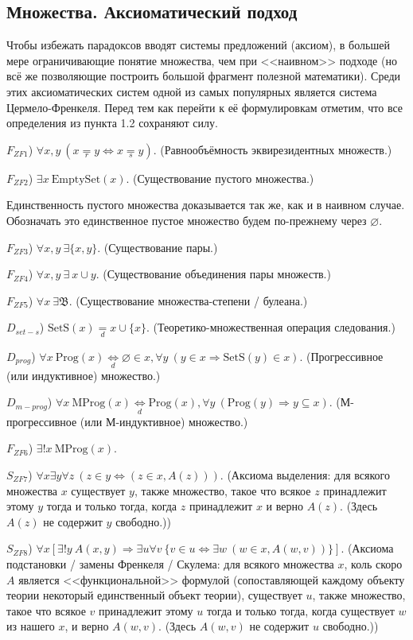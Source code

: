 \documentclass[a4paper]{article}
\newcommand{\Def}[0]{\underset{d}{\Leftrightarrow}}
\newcommand{\defeq}[0]{\underset{d}{=}}
\newcommand{\eqs}[0]{\underset{s}{=}} %
\newcommand{\eqr}[0]{\underset{r}{=}} %
\newcommand{\EmptySet}[1]{\mathrm{EmptySet}(#1)}
\newcommand{\SetS}[1]{\mathrm{SetS}(#1)}
\newcommand{\Prog}[1]{\mathrm{Prog}(#1)}
\newcommand{\MProg}[1]{\mathrm{MProg}(#1)}
\begin{document}
\subsection{Множества. Аксиоматический подход}

Чтобы избежать парадоксов вводят системы предложений (аксиом), в большей мере ограничивающие понятие множества, чем при <<наивном>> подходе (но всё же позволяющие построить большой фрагмент полезной математики). Среди этих аксиоматических систем одной из самых популярных является система Цермело-Френкеля. Перед тем как перейти к её формулировкам отметим, что все определения из пункта 1.2 сохраняют силу.

\bigskip

$F_{ZF1}$) $\forall x, y~ (x \eqr y \Leftrightarrow x \eqs y)$. (Равнообъёмность эквирезидентных множеств.)

$F_{ZF2}$) $\exists x~ \EmptySet{x}$. (Существование пустого множества.)

Единственность пустого множества доказывается так же, как и в наивном случае. Обозначать это единственное пустое множество будем по-прежнему через $\varnothing$.

$F_{ZF3}$) $\forall x, y~ \exists \{x, y\}$. (Существование пары.)

$F_{ZF4}$) $\forall x, y~ \exists~ x \cup y$. (Существование объединения пары множеств.)

$F_{ZF5}$) $\forall x~ \exists \mathfrak{B}$. (Существование множества-степени / булеана.)

$D_{set-s}$) $\SetS{x} \defeq x \cup \{x\}$. (Теоретико-множественная операция следования.)

$D_{prog}$) $\forall x~ \Prog{x} \Def \varnothing \in x, \forall y~ (y \in x \Rightarrow \SetS{y} \in x)$. (Прогрессивное (или индуктивное) множество.)

$D_{m-prog}$) $\forall x~ \MProg{x} \Def \Prog{x}, \forall y~ (\Prog{y} \Rightarrow y \subseteq x)$. (М-прогрессивное (или М-индуктивное) множество.)

$F_{ZF6}$) $\exists! x~ \MProg{x}$.

$S_{ZF7}$) $\forall x \exists y \forall z~ (z \in y \Leftrightarrow (z \in x, A(z)))$. (Аксиома выделения: для всякого множества $x$ существует $y$, также множество, такое что всякое $z$ принадлежит этому $y$ тогда и только тогда, когда $z$ принадлежит $x$ и верно $A(z)$. (Здесь $A(z)$ не содержит $y$ свободно.))

$S_{ZF8}$) $\forall x [\exists! y~ A(x, y) \Rightarrow \exists u \forall v~ \{v \in u \Leftrightarrow \exists w~ (w \in x, A(w, v))\}]$. (Аксиома подстановки / замены Френкеля / Скулема: для всякого множества $x$, коль скоро $A$ является <<функциональной>> формулой (сопоставляющей каждому объекту теории некоторый единственный объект теории), существует $u$, также множество, такое что всякое $v$ принадлежит этому $u$ тогда и только тогда, когда существует $w$ из нашего $x$, и верно $A(w, v)$. (Здесь $A(w, v)$ не содержит $u$ свободно.))
\end{document}
